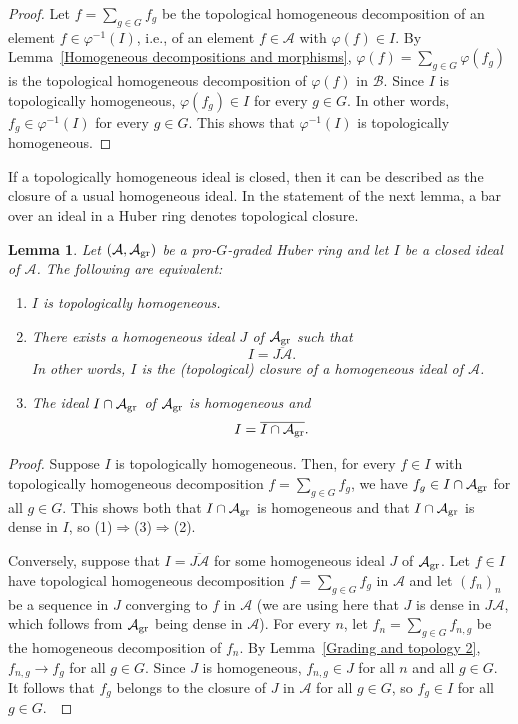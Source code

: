 \documentclass[12pt,twoside,a4paper]{article}
\newtheorem{lemma}[thm]{Lemma}
\theoremstyle{definition}
\theoremstyle{remark}
\newcommand\gr{{\rm gr}}
\begin{document}
\begin{proof}Let $f=\sum_{g\in G}f_{g}$ be the topological homogeneous decomposition of an element $f\in \varphi^{-1}(I)$, i.e., of an element $f\in \mathcal{A}$ with $\varphi(f)\in I$. By Lemma~\ref{Homogeneous decompositions and morphisms}, $\varphi(f)=\sum_{g\in G}\varphi(f_{g})$ is the topological homogeneous decomposition of $\varphi(f)$ in $\mathcal{B}$. Since $I$ is topologically homogeneous, $\varphi(f_{g})\in I$ for every $g\in G$. In other words, $f_{g}\in \varphi^{-1}(I)$ for every $g\in G$. This shows that $\varphi^{-1}(I)$ is topologically homogeneous. \end{proof}
If a topologically homogeneous ideal is closed, then it can be described as the closure of a usual homogeneous ideal. In the statement of the next lemma, a bar over an ideal in a Huber ring denotes topological closure.
\begin{lemma}\label{Closed topologically homogeneous ideals}Let $(\mathcal{A}, \mathcal{A}_{\gr})$ be a pro-$G$-graded Huber ring and let $I$ be a closed ideal of $\mathcal{A}$. The following are equivalent: \begin{enumerate}[(1)]\item $I$ is topologically homogeneous. \item There exists a homogeneous ideal $J$ of $\mathcal{A}_{\gr}$ such that \begin{equation*}I=\overline{J\mathcal{A}}.\end{equation*}In other words, $I$ is the (topological) closure of a homogeneous ideal of $\mathcal{A}$. \item The ideal $I\cap \mathcal{A}_{\gr}$ of $\mathcal{A}_{\gr}$ is homogeneous and \begin{equation*}I=\overline{I\cap \mathcal{A}_{\gr}}.\end{equation*}\end{enumerate}\end{lemma}
\begin{proof}Suppose $I$ is topologically homogeneous. Then, for every $f\in I$ with topologically homogeneous decomposition $f=\sum_{g\in G}f_{g}$, we have $f_{g}\in I\cap \mathcal{A}_{\gr}$ for all $g\in G$. This shows both that $I\cap \mathcal{A}_{\gr}$ is homogeneous and that $I\cap \mathcal{A}_{\gr}$ is dense in $I$, so (1)$\Rightarrow$(3)$\Rightarrow$(2).

Conversely, suppose that $I=\overline{J\mathcal{A}}$ for some homogeneous ideal $J$ of $\mathcal{A}_{\gr}$. Let $f\in I$ have topological homogeneous decomposition $f=\sum_{g\in G}f_{g}$ in $\mathcal{A}$ and let $(f_{n})_{n}$ be a sequence in $J$ converging to $f$ in $\mathcal{A}$ (we are using here that $J$ is dense in $J\mathcal{A}$, which follows from $\mathcal{A}_{\gr}$ being dense in $\mathcal{A}$). For every $n$, let $f_{n}=\sum_{g\in G}f_{n, g}$ be the homogeneous decomposition of $f_{n}$. By Lemma~\ref{Grading and topology 2}, $f_{n, g}\to f_{g}$ for all $g\in G$. Since $J$ is homogeneous, $f_{n, g}\in J$ for all $n$ and all $g\in G$. It follows that $f_{g}$ belongs to the closure of $J$ in $\mathcal{A}$ for all $g\in G$, so $f_{g}\in I$ for all $g\in G$. \end{proof}
\end{document}

